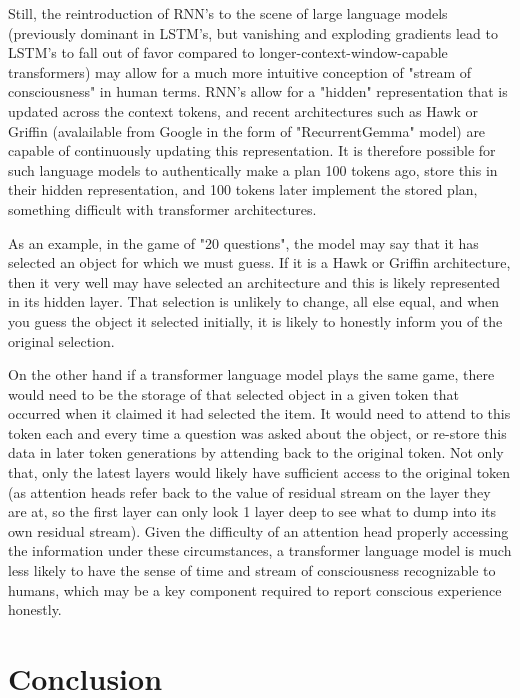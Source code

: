 \documentclass{article}
\begin{document}
Still, the reintroduction of RNN's to the scene of large language models (previously dominant in LSTM's, but vanishing and exploding gradients lead to LSTM's to fall out of favor compared to longer-context-window-capable transformers) may allow for a much more intuitive conception of "stream of consciousness" in human terms. RNN's allow for a "hidden" representation that is updated across the context tokens, and recent architectures such as Hawk or Griffin \citep{de2024griffinmixinggatedlinear} (avalailable from Google in the form of "RecurrentGemma" model) are capable of continuously updating this representation. It is therefore possible for such language models to authentically make a plan 100 tokens ago, store this in their hidden representation, and 100 tokens later implement the stored plan, something difficult with transformer architectures.

As an example, in the game of "20 questions", the model may say that it has selected an object for which we must guess. If it is a Hawk or Griffin architecture, then it very well may have selected an architecture and this is likely represented in its hidden layer. That selection is unlikely to change, all else equal, and when you guess the object it selected initially, it is likely to honestly inform you of the original selection.

On the other hand if a transformer language model plays the same game, there would need to be the storage of that selected object in a given token that occurred when it claimed it had selected the item. It would need to attend to this token each and every time a question was asked about the object, or re-store this data in later token generations by attending back to the original token. Not only that, only the latest layers would likely have sufficient access to the original token (as attention heads refer back to the value of residual stream on the layer they are at, so the first layer can only look 1 layer deep to see what to dump into its own residual stream). Given the difficulty of an attention head properly accessing the information under these circumstances, a transformer language model is much less likely to have the sense of time and stream of consciousness recognizable to humans, which may be a key component required to report conscious experience honestly.

\section{Conclusion}
\end{document}
